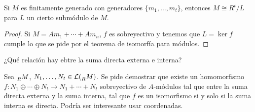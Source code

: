 \begin{cor}
  Si \(M\) es finitamente generado con generadores \(\{m_1, \ldots, m_t\}\),
  entonces \(M\cong R^t/L\) para \(L\) un cierto submódulo de \(M\).
\end{cor}

\begin{proof}
  Si \(M=Am_1+\cdots+Am_n\), \(f\) es sobreyectivo y tenemos que \(L=\ker f\) cumple lo
  que se pide por el teorema de isomorfía para módulos.
\end{proof}

¿Qué relación hay ebtre la suma directa externa e interna?
\begin{ejercicio}
  Sea \(\prescript{}{R}{M}\), \(N_1,\ldots,
  N_t\in\mathcal{L}(\prescript{}{R}{M})\). Se pide demostrar que existe
  un homomorfismo \(f:N_1\oplus\cdots\oplus N_t\longrightarrow
  N_1{+}\cdots{+}N_t\)
  sobreyectivo de \(A\)-módulos tal que entre la suma directa
  externa y la suma interna, tal que \(f\) es un isomorfismo si y solo si
  la suma interna es directa. Podría ser interesante usar coordenadas.
\end{ejercicio}